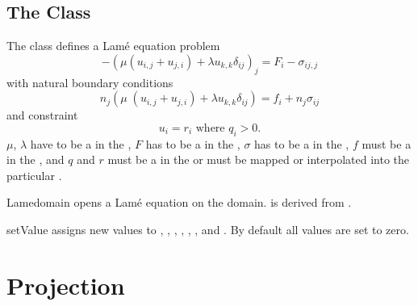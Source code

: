 \subsection{The \Lame Class}
The \Lame class defines a Lam\'e equation problem
\begin{equation}\label{LE.1}
-(\mu (u_{i,j}+u_{j,i})+\lambda u_{k,k}\delta_{ij})_{j} = F_{i}-\sigma_{ij,j}
\end{equation}
with natural boundary conditions
\begin{equation}\label{LE.2}
n_{j}(\mu \; (u_{i,j}+u_{j,i})+\lambda u_{k,k}\delta_{ij}) = f_{i}+n_{j}\sigma_{ij}
\end{equation}
and constraint
\begin{equation}\label{LE.3}
u_{i}=r_{i} \mbox{ where } q_{i}>0 .
\end{equation}
$\mu$, $\lambda$ have to be a \Scalar in the \Function, $F$ has to be a
\Vector in the \Function, $\sigma$ has to be a \Tensor in the \Function,
$f$ must be a \Vector in the \FunctionOnBoundary, and $q$ and $r$ must be a
\Vector in the \SolutionFS or must be mapped or interpolated into the
particular \FunctionSpace.

\begin{classdesc}{Lame}{domain}
opens a Lam\'e equation on the \Domain domain. \Lame is derived from \LinearPDE.
\end{classdesc}
\begin{methoddesc}[Lame]{setValue}{       }
assigns new values to , , , ,
, , and . By default all values are set to zero.
\end{methoddesc}

\section{Projection}
\label{SEC Projection}

